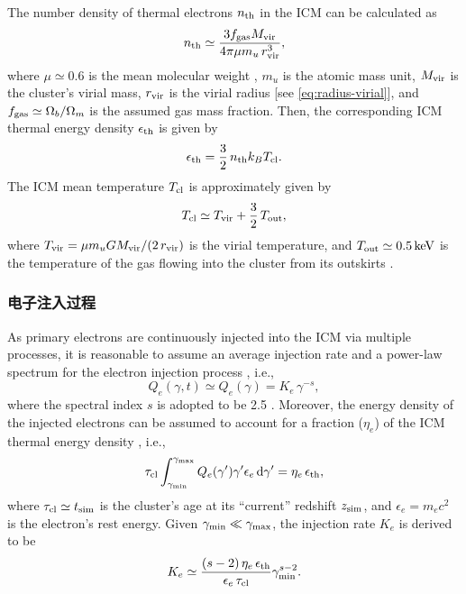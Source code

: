 The number density of thermal electrons $n_{\mathrm{th}}$ in the ICM can be
calculated as
\begin{equation}
  \label{eq:n-th}
  n_{\mathrm{th}} \simeq
    \frac{3 f_{\mathrm{gas}} M_{\mathrm{vir}}}{4\pi \mu m_u \,r^3_{\mathrm{vir}}},
\end{equation}
where
$\mu \simeq 0.6$ is the mean molecular weight \cite{ettori2013},
$m_u$ is the atomic mass unit,
$M_{\mathrm{vir}}$ is the cluster's virial mass,
$r_{\mathrm{vir}}$ is the virial radius [see \autoref{eq:radius-virial}],
and
$f_{\mathrm{gas}} \simeq \Omega_b/\Omega_m$ is the assumed gas mass fraction.
Then, the corresponding ICM thermal energy density $\epsilon_{\mathrm{th}}$
is given by
\begin{equation}
  \label{eq:e-th}
  \epsilon_{\mathrm{th}} = \frac{3}{2} \,n_{\mathrm{th}} k_B T_{\mathrm{cl}}.
\end{equation}
The ICM mean temperature $T_{\mathrm{cl}}$ is approximately given by
\cite{cavaliere1998}
\begin{equation}
  \label{eq:t-icm}
  T_{\mathrm{cl}} \simeq T_{\mathrm{vir}} + \frac{3}{2} \,T_{\mathrm{out}} ,
\end{equation}
where
$T_{\mathrm{vir}} = \mu m_u G M_{\mathrm{vir}} / (2 \,r_{\mathrm{vir}})$ is the virial
temperature, and $T_{\R{out}} \simeq \SI{0.5}{\keV}$ is the temperature
of the gas flowing into the cluster from its outskirts \cite{fujita2003}.

\subsubsection{电子注入过程}

As primary electrons are continuously injected into the ICM via multiple
processes, it is reasonable to assume an average injection rate and a
power-law spectrum for the electron injection process
\cite{cassano2005,donnert2014}, i.e.,
\begin{equation}
  \label{eq:electron-inj}
  Q_e(\gamma, t) \simeq Q_e(\gamma) = K_e \,\gamma^{-s},
\end{equation}
where the spectral index $s$ is adopted to be 2.5 \cite{cassano2005}.
Moreover, the energy density of the injected electrons can be assumed to
account for a fraction ($\eta_e$) of the ICM thermal energy density
\cite{cassano2005}, i.e.,
\begin{equation}
  \tau_{\mathrm{cl}} \int_{\gamma_{\mathrm{min}}}^{\gamma_{\mathrm{max}}}
  Q_e(\gamma') \gamma'\epsilon_e \,\mathrm{d}\gamma'
  = \eta_e \,\epsilon_{\mathrm{th}},
\end{equation}
where $\tau_{\mathrm{cl}} \simeq t_{\mathrm{sim}}$ is the cluster's age at its
\enquote{current} redshift $z_{\mathrm{sim}}$,
and $\epsilon_e = m_e c^2$ is the electron's rest energy.
Given $\gamma_{\mathrm{min}} \ll \gamma_{\mathrm{\max}}$, the injection rate $K_e$
is derived to be
\begin{equation}
  \label{eq:injrate}
  K_e \simeq \frac{(s-2)\,\eta_e\,\epsilon_{\mathrm{th}}}{\epsilon_e\,\tau_{\mathrm{cl}}}
    \gamma_{\mathrm{min}}^{s-2}.
\end{equation}

